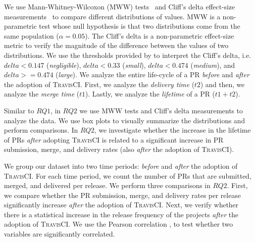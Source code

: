 We use Mann-Whitney-Wilcoxon (MWW) tests~\citep{wilks2011statistical} and Cliff's delta effect-size measurements~\citep{cliff1993dominance} to compare different distributions of values. MWW is a non-parametric test whose null hypothesis is that two distributions come from the same population ($\alpha = 0.05$). The Cliff's delta is a non-parametric effect-size metric to verify the magnitude of the difference between the values of two distributions. 
We use the thresholds provided by \citet{Romano:2006} to interpret the Cliff's delta, i.e. $delta<0.147$ (\textit{negligible}), $delta<0.33$ (\textit{small}), $delta<0.474$ (\textit{medium}), and $delta>=0.474$ (\textit{large}). We analyze the entire life-cycle of a PR \textit{before} and \textit{after} the adoption of \textsc{TravisCI}. First, we analyze the \textit{delivery time} ($t2$) and then, we analyze the {\em merge time} ($t1$). Lastly, we analyze the {\em lifetime} of a PR ($t1 + t2$).

Similar to $RQ1$, in $RQ2$ we use MWW tests \citep{wilks2011statistical}
and Cliff's delta measurements \citep{cliff1993dominance} to analyze the data. We use
box plots \citep{Williamson-1989} to visually summarize the distributions and perform comparisons.
In $RQ2$, we investigate whether the increase in the lifetime of PRs
\textit{after} adopting \textsc{TravisCI} is related to a significant increase in PR
submission, merge, and delivery rates (also \textit{after} the adoption of \textsc{TravisCI}). 

We group our dataset into two time periods: \textit{before} and \textit{after} the
adoption of \textsc{TravisCI}. For each time period, we count the number of PRs that are submitted,
merged, and delivered per release.  We perform three comparisons in $RQ2$.
First, we compare whether the PR submission, merge, and delivery rates per
release significantly increase \textit{after} the adoption of \textsc{TravisCI}. Next, we verify
whether there is a statistical increase in the release frequency of the
projects \textit{after} the adoption of \textsc{TravisCI}. 
We use the Pearson correlation \citep{best1975algorithm},
to test whether two variables are significantly correlated. 

